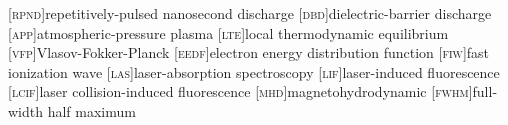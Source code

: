 [\textsc{rpnd}]{repetitively-pulsed nanosecond discharge}
[\textsc{dbd}]{dielectric-barrier discharge}
[\textsc{app}]{atmospheric-pressure plasma}
[\textsc{lte}]{local thermodynamic equilibrium}
[\textsc{vfp}]{Vlasov-Fokker-Planck}
[\textsc{eedf}]{electron energy distribution function}
[\textsc{fiw}]{fast ionization wave}
[\textsc{las}]{laser-absorption spectroscopy}
[\textsc{lif}]{laser-induced fluorescence}
[\textsc{lcif}]{laser collision-induced fluorescence}
[\textsc{mhd}]{magnetohydrodynamic}
[\textsc{fwhm}]{full-width half maximum}
